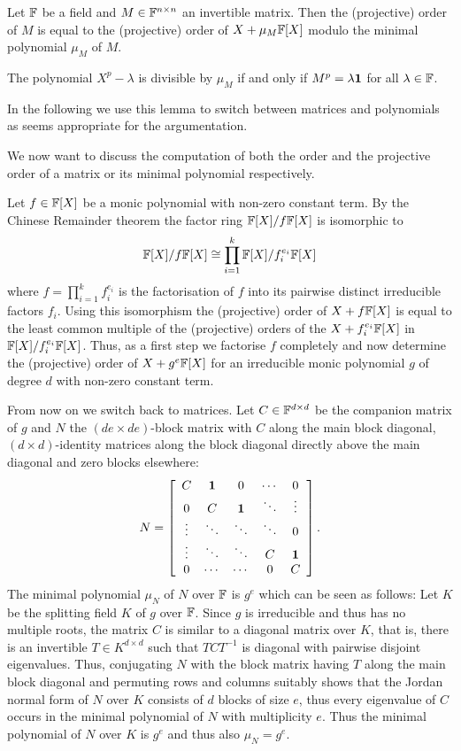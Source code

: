 \begin{Lemm}
Let $\mathbb{F}$ be a field and $M \in \mathbb{F}^{n \times n}$ an invertible matrix.
Then the (projective) order of $M$ is equal to the (projective) order of
$X + \mu_M \mathbb{F}[X]$ modulo the minimal polynomial $\mu_M$ of $M$.
\end{Lemm}
\proofbeg 
The polynomial $X^p-\lambda$ is divisible by $\mu_M$ if and
only if $M^p = \lambda \mathbf{1}$ for all $\lambda \in \mathbb{F}$.
\proofend

In the following we use this lemma to switch between matrices and
polynomials as seems appropriate for the argumentation.

We now want to discuss the computation of both the order and the
projective order of a matrix or its minimal polynomial respectively.

Let $f \in \mathbb{F}[X]$ be a monic polynomial with non-zero constant term. 
By the Chinese Remainder theorem the factor ring
$\mathbb{F}[X]/f\mathbb{F}[X]$ is isomorphic to
\[ \mathbb{F}[X]/f\mathbb{F}[X] \cong
   \prod_{i=1}^k \mathbb{F}[X]/f_i^{e_i} \mathbb{F}[X] \]
where $f = \prod_{i=1}^k f_i^{e_i}$ is the factorisation of $f$ into
its pairwise distinct irreducible factors $f_i$. Using this
isomorphism the (projective) order of $X+f\mathbb{F}[X]$ is equal to the least 
common multiple of the (projective) orders of the $X + f_i^{e_i}
\mathbb{F}[X]$ in $\mathbb{F}[X]/f_i^{e_i}\mathbb{F}[X]$. Thus, as a first step we factorise
$f$ completely and now determine the (projective) order of
$X+g^e\mathbb{F}[X]$ for an irreducible monic polynomial $g$ of degree $d$ 
with non-zero constant term.

From now on we switch back to matrices. Let $C \in \mathbb{F}^{d \times d}$ be 
the companion matrix of $g$ and $N$ the $(de \times de)$-block matrix with 
$C$ along the main block diagonal, $(d \times d)$-identity matrices
along the block diagonal directly above the main diagonal and zero blocks
elsewhere:
\[ N = \left[ \begin{array}{ccccc}
    C      & \mathbf{1}   & 0      & \cdots & 0 \\
    0      & C      & \mathbf{1}   & \ddots & \vdots \\
    \vdots & \ddots & \ddots & \ddots & 0 \\
    \vdots & \ddots & \ddots & C      & \mathbf{1} \\
    0      & \cdots & \cdots & 0      & C
\end{array} \right]. \]
The minimal polynomial $\mu_N$ of $N$ over $\mathbb{F}$ is $g^e$ 
which can be seen as follows:
Let $K$ be the splitting field $K$ of $g$ over $\mathbb{F}$. Since $g$ is
irreducible and thus has no multiple roots, the 
matrix $C$ is similar to a diagonal matrix over $K$, that is, there is an
invertible $T \in K^{d \times d}$ such that $TCT^{-1}$ is diagonal
with pairwise disjoint eigenvalues.
Thus, conjugating $N$ with the block matrix having $T$ along the
main block diagonal and permuting rows and columns suitably shows that
the Jordan normal form of $N$ over $K$ consists of $d$ blocks of
size $e$, thus every eigenvalue of $C$ occurs in the minimal
polynomial of $N$ with multiplicity $e$. Thus the minimal polynomial
of $N$ over $K$ is $g^e$ and thus also $\mu_N = g^e$.

